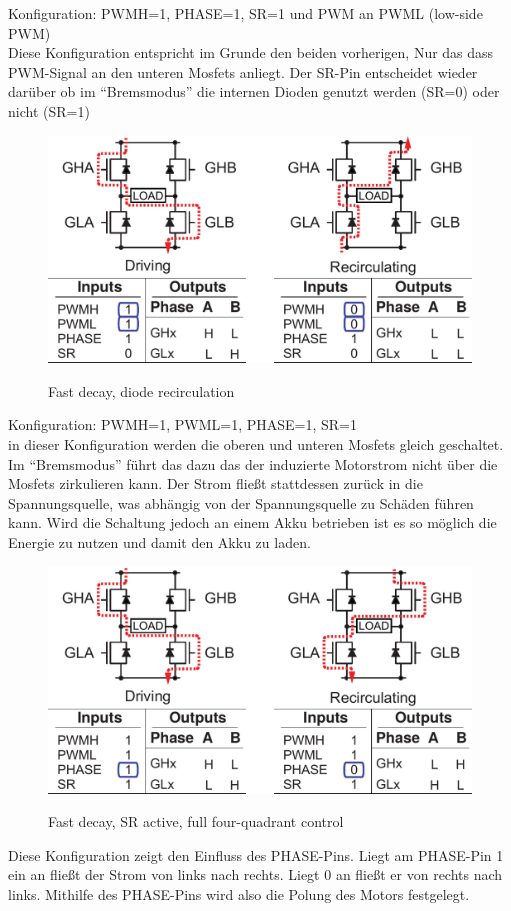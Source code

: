 Konfiguration: PWMH=1, PHASE=1, SR=1 und PWM an PWML (low-side PWM)\\
Diese Konfiguration entspricht im Grunde den beiden vorherigen, Nur das dass PWM-Signal
an den unteren Mosfets anliegt. Der SR-Pin entscheidet wieder darüber ob im ``Bremsmodus''
die internen Dioden genutzt werden (SR=0) oder nicht (SR=1)




\begin{figure}[H]
\centering
\includegraphics[width=.8\textwidth]{3941_4.png}\\
\caption{Fast decay, diode recirculation}%
\label{fig:3941_4}
\end{figure}


Konfiguration: PWMH=1, PWML=1, PHASE=1, SR=1\\
in dieser Konfiguration werden die oberen und unteren Mosfets gleich geschaltet. Im
``Bremsmodus'' führt das dazu das der induzierte Motorstrom nicht über die Mosfets
zirkulieren kann. Der Strom fließt stattdessen zurück in die Spannungsquelle, was
abhängig von der Spannungsquelle zu Schäden führen kann. Wird die Schaltung jedoch an
einem Akku betrieben ist es so möglich die Energie zu nutzen und damit den Akku
zu laden.

\begin{figure}[H]
\centering
\includegraphics[width=.8\textwidth]{3941_5.png}\\
\caption{Fast decay, SR active, full four-quadrant control}%
\label{fig:3941_5}
\end{figure}

Diese Konfiguration zeigt den Einfluss des PHASE-Pins. Liegt am PHASE-Pin 1 ein an
fließt der Strom von links nach rechts. Liegt 0 an fließt er von rechts nach links.
Mithilfe des PHASE-Pins wird also die Polung des Motors festgelegt.
